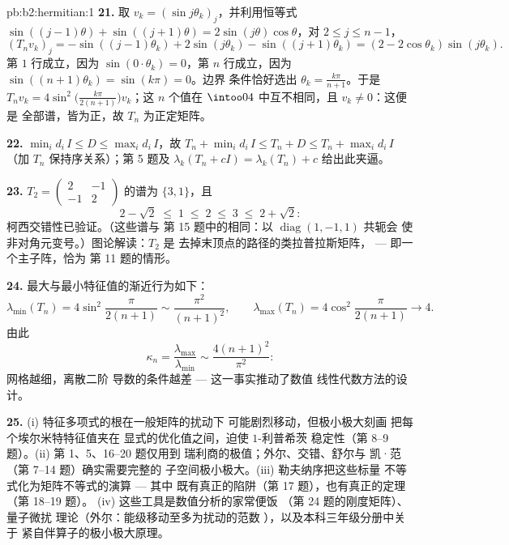 \begin{solution}{pb:b2:hermitian:1}
\textbf{21.} 取 $v_k = (\sin j\theta_k)_j$，并利用恒等式
$\sin((j-1)\theta) + \sin((j+1)\theta) =
2\sin(j\theta)\cos\theta$，对 $2 \leq j \leq n-1$，
\[
(T_nv_k)_j = -\sin((j{-}1)\theta_k) + 2\sin(j\theta_k) -
\sin((j{+}1)\theta_k)
= (2 - 2\cos\theta_k)\sin(j\theta_k) .
\]
第 $1$ 行成立，因为 $\sin(0\cdot\theta_k) = 0$，第 $n$
行成立，因为 $\sin((n+1)\theta_k) = \sin(k\pi) = 0$。边界
条件恰好选出 $\theta_k = \frac{k\pi}{n+1}$。于是
$T_nv_k = 4\sin^2\bigl(\frac{k\pi}{2(n+1)}\bigr)v_k$；这 $n$
个值在 $\intoo04$ 中互不相同，且 $v_k \neq 0$：这便是
全部谱，皆为正，故 $T_n$ 为正定矩阵。

\textbf{22.} $\min_id_i\,I \leq D \leq \max_id_i\,I$，故 $T_n +
\min_id_i\,I \leq T_n + D \leq T_n + \max_id_i\,I$
（加 $T_n$ 保持序关系）；第 5 题及
$\lambda_k(T_n + cI) = \lambda_k(T_n) + c$ 给出此夹逼。

\textbf{23.} $T_2 = \begin{pmatrix} 2 & -1\\ -1 &
2\end{pmatrix}$ 的谱为 $\{3, 1\}$，且
\[
2 - \sqrt2 \;\leq\; 1 \;\leq\; 2 \;\leq\; 3 \;\leq\; 2 +
\sqrt2 :
\]
柯西交错性已验证。（这些谱与
第 15 题中的相同：以 $\operatorname{diag}(1,-1,1)$ 共轭会
使非对角元变号。）图论解读：$T_2$ 是
去掉末顶点的路径的类拉普拉斯矩阵，
--- 即一个主子阵，恰为
第 11 题的情形。

\textbf{24.} 最大与最小特征值的渐近行为如下：
\[
\lambda_{\min}(T_n) = 4\sin^2\frac{\pi}{2(n+1)}
\sim \frac{\pi^2}{(n+1)^2},
\qquad
\lambda_{\max}(T_n) = 4\cos^2\frac{\pi}{2(n+1)}
\longrightarrow 4 .
\]
由此
\[
\kappa_n = \frac{\lambda_{\max}}{\lambda_{\min}}
\sim \frac{4(n+1)^2}{\pi^2} :
\]
网格越细，离散二阶
导数的条件越差 --- 这一事实推动了数值
线性代数方法的设计。

\textbf{25.} (i) 特征多项式的根在一般矩阵的扰动下
可能剧烈移动，但极小极大刻画
把每个埃尔米特特征值夹在
显式的优化值之间，迫使 $1$-利普希茨
稳定性（第 8--9 题）。(ii) 第 1、5、16--20 题仅用到
瑞利商的极值；外尔、交错、舒尔与
凯·范（第 7--14 题）确实需要完整的
子空间极小极大。(iii) 勒夫纳序把这些标量
不等式化为矩阵不等式的演算 --- 其中
既有真正的陷阱（第 17 题），也有真正的定理（第 18--19 题）。
(iv) 这些工具是数值分析的家常便饭
（第 24 题的刚度矩阵）、量子微扰
理论（外尔：能级移动至多为扰动的范数
），以及本科三年级分册中关于
紧自伴算子的极小极大原理。
\end{solution}
